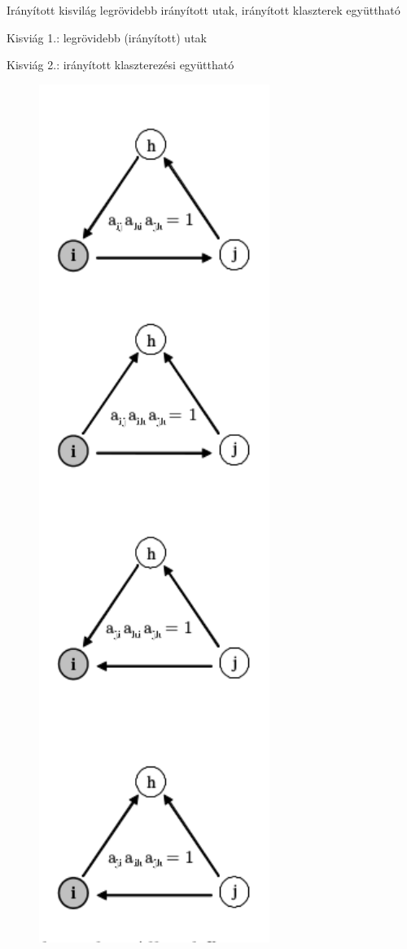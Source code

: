 \documentclass{beamer}
\newlength{\onecolwid}
\begin{document}
\begin{frame}[t]
\begin{columns}[t]
\begin{column}{\onecolwid}
        \begin{alertblock}{Irányított kisvilág}  
          legrövidebb irányított utak, 
          irányított klaszterek együttható \citep{fagiolo2007clustering}
        \end{alertblock} %
        \begin{block}{Kisviág 1.: legrövidebb (irányított) utak} \end{block}
          \begin{block}{Kisviág 2.: irányított klaszterezési együttható}
            \begin{figure}
              \includegraphics[width=7.5cm]{triangle-directions}

\end{figure}
\end{block}
\end{column}
\end{columns}
\end{frame}
\end{document}
